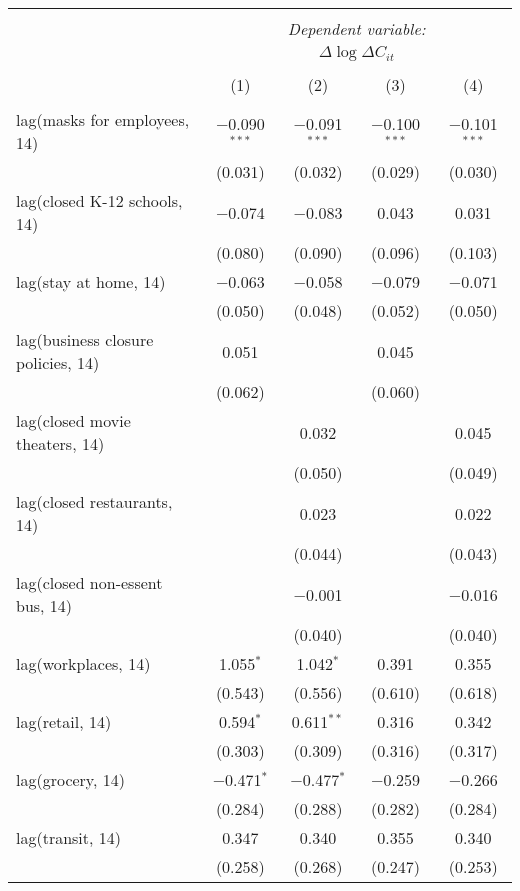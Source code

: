 \begin{tabular}{@{\extracolsep{1pt}}lcccc} 
\\[-1.8ex]\hline 
\hline \\[-1.8ex] 
 & \multicolumn{4}{c}{\textit{Dependent variable:}} \\ 
\cline{2-5} 
 & \multicolumn{4}{c}{$\Delta \log \Delta C_{it}$} \\ 
\\[-1.8ex] & (1) & (2) & (3) & (4)\\ 
\hline \\[-1.8ex] 
 lag(masks for employees, 14) & $-$0.090$^{***}$ & $-$0.091$^{***}$ & $-$0.100$^{***}$ & $-$0.101$^{***}$ \\ 
  & (0.031) & (0.032) & (0.029) & (0.030) \\ 
  lag(closed K-12 schools, 14) & $-$0.074 & $-$0.083 & 0.043 & 0.031 \\ 
  & (0.080) & (0.090) & (0.096) & (0.103) \\ 
  lag(stay at home, 14) & $-$0.063 & $-$0.058 & $-$0.079 & $-$0.071 \\ 
  & (0.050) & (0.048) & (0.052) & (0.050) \\ 
  lag(business closure policies, 14) & 0.051 &  & 0.045 &  \\ 
  & (0.062) &  & (0.060) &  \\ 
  lag(closed movie theaters, 14) &  & 0.032 &  & 0.045 \\ 
  &  & (0.050) &  & (0.049) \\ 
  lag(closed restaurants, 14) &  & 0.023 &  & 0.022 \\ 
  &  & (0.044) &  & (0.043) \\ 
  lag(closed non-essent bus, 14) &  & $-$0.001 &  & $-$0.016 \\ 
  &  & (0.040) &  & (0.040) \\ 
  lag(workplaces, 14) & 1.055$^{*}$ & 1.042$^{*}$ & 0.391 & 0.355 \\ 
  & (0.543) & (0.556) & (0.610) & (0.618) \\ 
  lag(retail, 14) & 0.594$^{*}$ & 0.611$^{**}$ & 0.316 & 0.342 \\ 
  & (0.303) & (0.309) & (0.316) & (0.317) \\ 
  lag(grocery, 14) & $-$0.471$^{*}$ & $-$0.477$^{*}$ & $-$0.259 & $-$0.266 \\ 
  & (0.284) & (0.288) & (0.282) & (0.284) \\ 
  lag(transit, 14) & 0.347 & 0.340 & 0.355 & 0.340 \\ 
  & (0.258) & (0.268) & (0.247) & (0.253) \\ 

\end{tabular}
